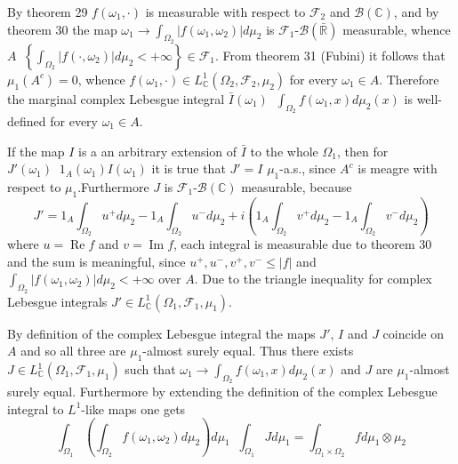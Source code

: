 \documentclass[a4paper]{article}
\newcommand{\obj}[1]{\left\{ #1 \right \}}
\newcommand{\brac}[1]{\left ( #1 \right )}
\newcommand{\abs}[1]{\left | #1 \right |}
\newcommand{\Rbar}{{\bar{\mathbb{R}}}}
\newcommand{\Cplx}{\mathbb{C}}
\newcommand{\Fcal}{\mathcal{F}}
\newcommand{\borel}[1]{\mathcal{B}\brac{#1}}
\newcommand{\defn}{\mathop{\overset{\Delta}{=}}\nolimits}
\newcommand{\re}{\operatorname{Re}\nolimits}
\newcommand{\im}{\operatorname{Im}\nolimits}
\begin{document}
By theorem 29 $f\brac{\omega_1, \cdot}$ is measurable with respect to $\Fcal_2$ and $\borel{\Cplx}$, and by theorem 30 the map $\omega_1\to\int_{\Omega_2}\abs{f\brac{\omega_1, \omega_2}} d\mu_2$ is $\Fcal_1$-$\borel{\Rbar}$ measurable, whence $A \defn \obj{\int_{\Omega_2}\abs{f\brac{\cdot, \omega_2}}d\mu_2 < +\infty} \in \Fcal_1$. From theorem 31 (Fubini) it follows that $\mu_1\brac{A^c} = 0$, whence $f\brac{\omega_1, \cdot} \in L^1_\Cplx\brac{\Omega_2, \Fcal_2, \mu_2}$ for every $\omega_1\in A$. Therefore the marginal complex Lebesgue integral $\bar{I}\brac{\omega_1}\defn\int_{\Omega_2} f\brac{\omega_1, x} d\mu_2\brac{x}$ is well-defined for every $\omega_1 \in A$.

If the map $I$ is a an arbitrary extension of $\bar{I}$ to the whole $\Omega_1$, then for $J'\brac{\omega_1} \defn 1_A\brac{\omega_1} I\brac{\omega_1}$ it is true that $J' = I$ $\mu_1$-a.s., since $A^c$ is meagre with respect to $\mu_1$.Furthermore $J$ is $\Fcal_1$-$\borel{\Cplx}$ measurable, because \[ J' = 1_A \int_{\Omega_2} u^+ d\mu_2 - 1_A \int_{\Omega_2} u^- d\mu_2 + i\brac{ 1_A \int_{\Omega_2} v^+ d\mu_2 - 1_A \int_{\Omega_2} v^- d\mu_2 } \] where $u=\re{f}$ and $v=\im{f}$, each integral is measurable due to theorem 30 and the sum is meaningful, since $u^+, u^-, v^+, v^-\leq \abs{f}$ and $\int_{\Omega_2} \abs{f\brac{\omega_1, \omega_2}} d\mu_2 < +\infty$ over $A$. Due to the triangle inequality for complex Lebesgue integrals $J'\in L^1_\Cplx\brac{\Omega_1, \Fcal_1, \mu_1}$.

By definition of the complex Lebesgue integral the maps $J'$, $I$ and $J$ coincide on $A$ and so all three are $\mu_1$-almost surely equal. Thus there exists $J\in L^1_\Cplx\brac{\Omega_1, \Fcal_1, \mu_1}$ such that $\omega_1\to\int_{\Omega_2} f\brac{\omega_1, x} d\mu_2\brac{x}$ and $J$ are $\mu_1$-almost surely equal. Furthermore by extending the definition of the complex Lebesgue integral to $L^1$-like maps one gets \[\int_{\Omega_1}\brac{ \int_{\Omega_2} f\brac{\omega_1, \omega_2} d\mu_2 }d\mu_1 \defn \int_{\Omega_1} J d\mu_1 = \int_{\Omega_1\times\Omega_2} f d\mu_1\otimes\mu_2\]
\end{document}
